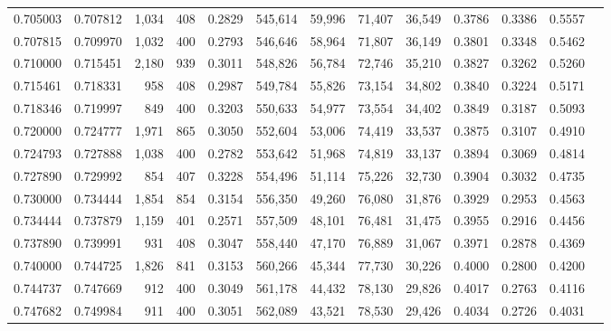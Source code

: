 \begin{tabular}{rrrrrrrrrrrrr}
0.705003 & 0.707812 &  1,034 &   408 &                                     0.2829 & 545,614 &  59,996 &  71,407 &  36,549 & 0.3786 & 0.3386 & 0.5557 \\
0.707815 & 0.709970 &  1,032 &   400 &                                     0.2793 & 546,646 &  58,964 &  71,807 &  36,149 & 0.3801 & 0.3348 & 0.5462 \\
0.710000 & 0.715451 &  2,180 &   939 &                                     0.3011 & 548,826 &  56,784 &  72,746 &  35,210 & 0.3827 & 0.3262 & 0.5260 \\
0.715461 & 0.718331 &    958 &   408 &                                     0.2987 & 549,784 &  55,826 &  73,154 &  34,802 & 0.3840 & 0.3224 & 0.5171 \\
0.718346 & 0.719997 &    849 &   400 &                                     0.3203 & 550,633 &  54,977 &  73,554 &  34,402 & 0.3849 & 0.3187 & 0.5093 \\
0.720000 & 0.724777 &  1,971 &   865 &                                     0.3050 & 552,604 &  53,006 &  74,419 &  33,537 & 0.3875 & 0.3107 & 0.4910 \\
0.724793 & 0.727888 &  1,038 &   400 &                                     0.2782 & 553,642 &  51,968 &  74,819 &  33,137 & 0.3894 & 0.3069 & 0.4814 \\
0.727890 & 0.729992 &    854 &   407 &                                     0.3228 & 554,496 &  51,114 &  75,226 &  32,730 & 0.3904 & 0.3032 & 0.4735 \\
0.730000 & 0.734444 &  1,854 &   854 &                                     0.3154 & 556,350 &  49,260 &  76,080 &  31,876 & 0.3929 & 0.2953 & 0.4563 \\
0.734444 & 0.737879 &  1,159 &   401 &                                     0.2571 & 557,509 &  48,101 &  76,481 &  31,475 & 0.3955 & 0.2916 & 0.4456 \\
0.737890 & 0.739991 &    931 &   408 &                                     0.3047 & 558,440 &  47,170 &  76,889 &  31,067 & 0.3971 & 0.2878 & 0.4369 \\
0.740000 & 0.744725 &  1,826 &   841 &                                     0.3153 & 560,266 &  45,344 &  77,730 &  30,226 & 0.4000 & 0.2800 & 0.4200 \\
0.744737 & 0.747669 &    912 &   400 &                                     0.3049 & 561,178 &  44,432 &  78,130 &  29,826 & 0.4017 & 0.2763 & 0.4116 \\
0.747682 & 0.749984 &    911 &   400 &                                     0.3051 & 562,089 &  43,521 &  78,530 &  29,426 & 0.4034 & 0.2726 & 0.4031 \\

\end{tabular}
